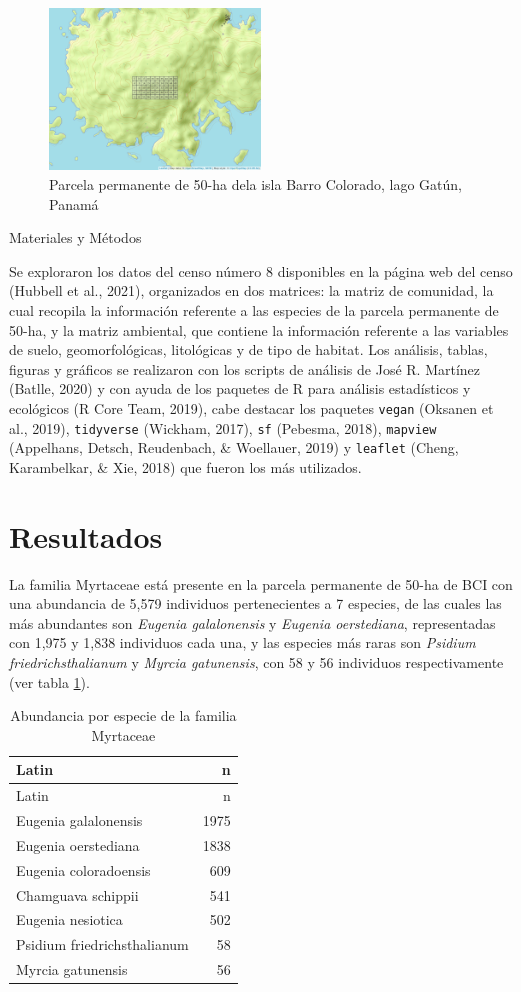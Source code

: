 \documentclass[11pt,]{article}
\begin{document}
\begin{figure}
\centering
\includegraphics[width=0.50000\textwidth]{mapa_cuadros.png}
\caption{Parcela permanente de 50-ha dela isla Barro Colorado, lago
Gatún, Panamá \label{fig:mapa_cuadros_bci}}
\end{figure}

Materiales y Métodos

Se exploraron los datos del censo número 8 disponibles en la página web
del censo (Hubbell et al., 2021), organizados en dos matrices: la matriz
de comunidad, la cual recopila la información referente a las especies
de la parcela permanente de 50-ha, y la matriz ambiental, que contiene
la información referente a las variables de suelo, geomorfológicas,
litológicas y de tipo de habitat. Los análisis, tablas, figuras y
gráficos se realizaron con los scripts de análisis de José R. Martínez
(Batlle, 2020) y con ayuda de los paquetes de R para análisis
estadísticos y ecológicos (R Core Team, 2019), cabe destacar los
paquetes \texttt{vegan} (Oksanen et al., 2019), \texttt{tidyverse}
(Wickham, 2017), \texttt{sf} (Pebesma, 2018), \texttt{mapview}
(Appelhans, Detsch, Reudenbach, \& Woellauer, 2019) y \texttt{leaflet}
(Cheng, Karambelkar, \& Xie, 2018) que fueron los más utilizados.

\section{Resultados}\label{resultados}

La familia Myrtaceae está presente en la parcela permanente de 50-ha de
BCI con una abundancia de 5,579 individuos pertenecientes a 7 especies,
de las cuales las más abundantes son \emph{Eugenia galalonensis} y
\emph{Eugenia oerstediana}, representadas con 1,975 y 1,838 individuos
cada una, y las especies más raras son \emph{Psidium
friedrichsthalianum} y \emph{Myrcia gatunensis}, con 58 y 56 individuos
respectivamente (ver tabla \ref{tab:abun_sp}).

\begin{longtable}[]{@{}lr@{}}
\caption{\label{tab:abun_sp}Abundancia por especie de la familia
Myrtaceae}\tabularnewline
\toprule
Latin & n\tabularnewline
\midrule
\endfirsthead
\toprule
Latin & n\tabularnewline
\midrule
\endhead
Eugenia galalonensis & 1975\tabularnewline
Eugenia oerstediana & 1838\tabularnewline
Eugenia coloradoensis & 609\tabularnewline
Chamguava schippii & 541\tabularnewline
Eugenia nesiotica & 502\tabularnewline
Psidium friedrichsthalianum & 58\tabularnewline
Myrcia gatunensis & 56\tabularnewline
\bottomrule
\end{longtable}
\end{document}
